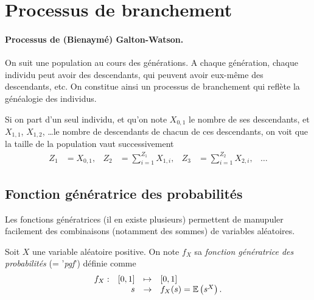 \section{Processus de branchement} \label{sec:Proba-Branchement}

\paragraph*{Processus de (Bienaymé) Galton-Watson.}
On suit une population au cours des générations. A chaque génération, chaque individu peut avoir des descendants, qui peuvent avoir eux-même des descendants, etc. On constitue ainsi un processus de branchement qui reflète la généalogie des individus.

Si on part d'un seul individu, et qu'on note $X_{0, 1}$ le nombre de ses descendants, et $X_{1, 1}$, $X_{1, 2}$, \dots le nombre de descendants de chacun de ces descendants, on voit que la taille de la population vaut successivement
\begin{align*}
  Z_1 & = X_{0, 1}, &
  Z_2 & = \sum_{i=1}^{Z_1} X_{1, i}, &
  Z_3 & = \sum_{i=1}^{Z_2} X_{2, i}, &
  \dots
\end{align*}

\subsection{Fonction génératrice des probabilités} 

Les fonctions génératrices (il en existe plusieurs) permettent de manupuler facilement des combinaisons (notamment des sommes) de variables aléatoires.

\begin{definition}
  Soit $X$ une variable aléatoire positive. On note $f_X$ sa {\em fonction génératrice des probabilités} (= '{\em pgf}') définie comme
  $$
  \begin{array}{rrcl}
    f_X : & [0, 1] & \mapsto & [0, 1] \\
      & s & \to & f_X(s) = \operatorname{\mathbb{E}}\left(s^X\right).
  \end{array}
  $$
\end{definition}

